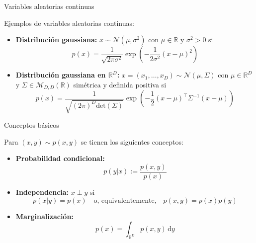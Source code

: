 \documentclass{beamer}
\newcommand{\R}{\mathbb{R}}
\begin{document}
\begin{frame}{Variables aleatorias continuas}

    Ejemplos de variables aleatorias continuas:
    \begin{itemize}
        \item \textbf{Distribución gaussiana:} $x\sim\mathcal{N}(\mu,\sigma^2)$ con $\mu\in\R$ y $\sigma^2>0$ si
              \begin{equation*}
                  p(x)=\frac{1}{\sqrt{2\pi\sigma^2}}\exp\left(-\frac{1}{2\sigma^2}(x-\mu)^2\right)
              \end{equation*}

        \item \textbf{Distribución gaussiana en $\R^D$:} $x=(x_1,\ldots,x_D)\sim \mathcal{N}(\mu,\Sigma)$ con $\mu\in\R^D$ y $\Sigma\in\mathcal{M}_{D,D}(\R)$ simétrica y definida positiva si
              \begin{equation*}
                  p(x)=\frac{1}{\sqrt{(2\pi)^D\text{det}(\Sigma)}}
                  \exp\left(
                  -\frac{1}{2}(x-\mu)^\top \Sigma^{-1}(x-\mu)
                  \right)
              \end{equation*}
    \end{itemize}
\end{frame}


\begin{frame}{Conceptos básicos}

    Para $(x,y)\sim p(x,y)$ se tienen los siguientes conceptos:

    \begin{itemize}
        \item \textbf{Probabilidad condicional:}
              \begin{equation*}
                  p(y|x):=\frac{p(x,y)}{p(x)}
              \end{equation*}
        \item \textbf{Independencia:} $x\perp y$ si
              \begin{equation*}
                  p(x|y)=p(x)
                  \quad\text{o, equivalentemente,}\quad
                  p(x,y)=p(x)p(y)
              \end{equation*}
        \item \textbf{Marginalización:}
              \begin{equation*}
                  p(x)=\int_{\R^D} p(x,y)\,\text{d}y
              \end{equation*}

    \end{itemize}
\end{frame}
\end{document}
